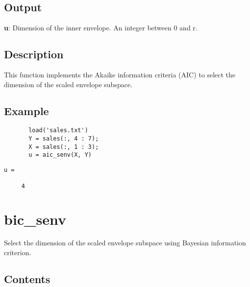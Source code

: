 \documentclass[a4paper,11pt,openany]{memoir}
\begin{document}
\subsection*{Output}

\begin{par}
\textbf{u}: Dimension of the inner envelope. An integer between 0 and r.
\end{par} \vspace{1em}


\subsection*{Description}

\begin{par}
This function implements the Akaike information criteria (AIC) to select the dimension of the scaled envelope subspace.
\end{par} \vspace{1em}


\subsection*{Example}


\begin{verbatim}       load('sales.txt')
       Y = sales(:, 4 : 7);
       X = sales(:, 1 : 3);
       u = aic_senv(X, Y)\end{verbatim}
    
        \color{lightgray}\ttfamily \begin{verbatim}
u =

     4

\end{verbatim} \rmfamily
\color{black}

\newpage


\rmfamily
\color{black}\section{bic\_senv}

\begin{par}
Select the dimension of the scaled envelope subspace using Bayesian information criterion.
\end{par} \vspace{1em}

\subsection*{Contents}
\end{document}
